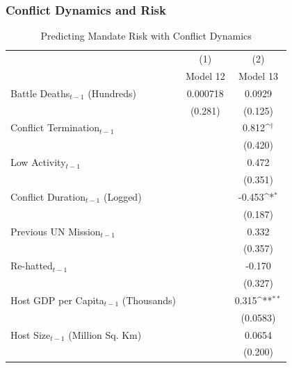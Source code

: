 \documentclass{beamer}
\begin{document}

\begin{frame}[fragile]
\frametitle{Conflict Dynamics and Risk}

\begin{table}[htbp]\centering
\fontsize{5}{6}\selectfont
\def\sym#1{\ifmmode^{#1}\else\(^{#1}\)\fi}
\caption{Predicting Mandate Risk with Conflict Dynamics\label{Fraq}}
\vspace{0.4cm}
\begin{tabular}{l*{2}{c}}
\hline\hline
                    &\multicolumn{1}{c}{(1)}        &\multicolumn{1}{c}{(2)}        \\
                    &         Model 12        &         Model 13        \\
\hline
Battle Deaths$_{t-1}$ (Hundreds)&    0.000718        &      0.0929        \\
                    &     (0.281)        &     (0.125)        \\
[0.25em]
Conflict Termination$_{t-1}$&                    &       0.812\sym{\dagger} \\
                    &                    &     (0.420)        \\
[0.25em]
Low Activity$_{t-1}$        &                    &       0.472        \\
                    &                    &     (0.351)        \\
[0.25em]
Conflict Duration$_{t-1}$ (Logged)&                    &      -0.453\sym{*} \\
                    &                    &     (0.187)        \\
[0.25em]
Previous UN Mission$_{t-1}$ &                    &       0.332        \\
                    &                    &     (0.357)        \\
[0.25em]
Re-hatted$_{t-1}$           &                    &      -0.170        \\
                    &                    &     (0.327)        \\
[0.25em]
Host GDP per Capita$_{t-1}$ (Thousands)&                    &       0.315\sym{**}\\
                    &                    &    (0.0583)        \\
[0.25em]
Host Size$_{t-1}$ (Million Sq. Km)&                    &      0.0654        \\
                    &                    &     (0.200)        \\

\end{tabular}
\end{table}
\end{frame}
\end{document}

